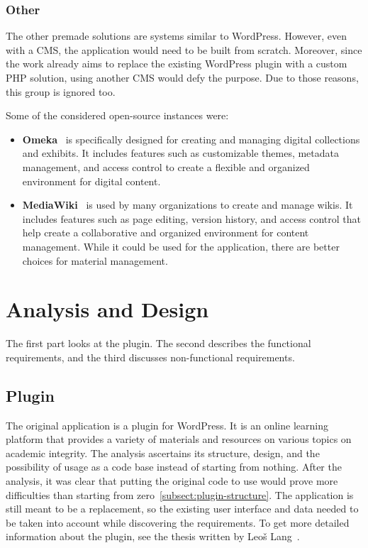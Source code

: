 \documentclass[
  digital,     %
  oneside,     %
  nosansbold,  %
  colorbold, %
  lof,         %
  lot,         %
]{fithesis4}
\begin{document}
\subsection{Other}

The other premade solutions are systems similar to WordPress. However, even with a CMS, the application would need to be built from scratch. Moreover, since the work already aims to replace the existing WordPress plugin with a custom PHP solution, using another CMS would defy the purpose. Due to those reasons, this group is ignored too.

Some of the considered open-source instances were:
\begin{itemize}

	\item \textbf{Omeka}~\cite{https://omeka.org/} is specifically designed for creating and managing digital collections and exhibits. It includes features such as customizable themes, metadata management, and access control to create a flexible and organized environment for digital content.
	
	\item \textbf{MediaWiki}~\cite{https://www.mediawiki.org/wiki/MediaWiki} is used by many organizations to create and manage wikis. It includes features such as page editing, version history, and access control that help create a collaborative and organized environment for content management. While it could be used for the application, there are better choices for material management.

\end{itemize}

\chapter{Analysis and Design}
\label{chap:analysis}

The first part looks at the plugin. The second describes the functional requirements,
and the third discusses \mbox{non-functional} requirements.

\section{Plugin}
\label{sect:plugin}

The original application is a plugin for WordPress. It is an online learning platform that provides a variety of materials and resources on various topics on academic integrity. The analysis ascertains its structure, design, and the possibility of usage as a code base instead of starting from nothing. After the analysis, it was clear that putting the original code to use would prove more difficulties than starting from zero~\ref{subsect:plugin-structure}. The application is still meant to be a replacement, so the existing user interface and data needed to be taken into account while discovering the requirements. To get more detailed information about the plugin, see the thesis written by Leoš Lang~\cite{lang18}.
\end{document}
